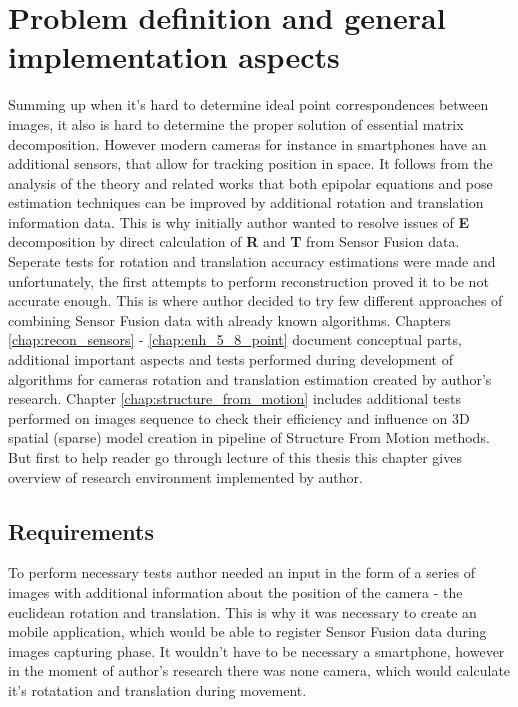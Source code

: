 \ifpdf
    \graphicspath{{figures/}{figures/comparisons}}
\else
    \graphicspath{{figures/}{figures/comparisons}}
\fi

\chapter{Problem definition and general implementation aspects}
Summing up when it's hard to determine ideal point correspondences between images, it also is hard to determine the proper solution of essential matrix decomposition. However modern cameras for instance in smartphones have an additional sensors, that allow for tracking position in space. It follows from the analysis of the theory and related works that both epipolar equations and pose estimation techniques can be improved by additional rotation and translation information data.
This is why initially author wanted to resolve issues of \textbf{E} decomposition by direct calculation of \textbf{R} and \textbf{T} from Sensor Fusion data. Seperate tests for rotation and translation accuracy estimations were made and unfortunately, the first attempts to perform reconstruction proved it to be not accurate enough. 
This is where author decided to try few different approaches of combining Sensor Fusion data with already known algorithms. Chapters \ref{chap:recon_sensors} - \ref{chap:enh_5_8_point} document conceptual parts, additional important aspects and tests performed during development of algorithms for cameras rotation and translation estimation created by author's research. 
Chapter \ref{chap:structure_from_motion} includes additional tests performed on images sequence to check their efficiency and influence on 3D spatial (sparse) model creation in pipeline of Structure From Motion methods. But first to help reader go through lecture of this thesis this chapter gives overview of research environment implemented by author.
\section{Requirements}
To perform necessary tests author needed an input in the form of a series of images with additional information about the position of the camera - the euclidean rotation and translation. 
This is why it was necessary to create an mobile application, which would be able to register Sensor Fusion data during images capturing phase.
It wouldn't have to be necessary a smartphone, however in the moment of author's research there was none camera, which would calculate it's rotatation and translation during movement. 

